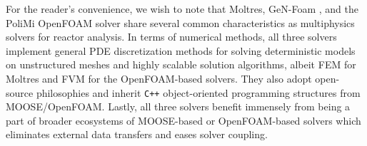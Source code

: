 For the reader's convenience, we wish to note that Moltres, GeN-Foam
\cite{fiorina_gen-foam_2015}, and the PoliMi OpenFOAM solver
\cite{aufiero_development_2014} share several common characteristics as
multiphysics solvers for reactor analysis. In terms of numerical methods, all
three solvers implement general \gls{PDE} discretization methods for solving
deterministic models on unstructured meshes and highly scalable solution
algorithms, albeit \gls{FEM} for Moltres and \gls{FVM} for the OpenFOAM-based
solvers. They also adopt open-source philosophies and inherit \texttt{C++}
object-oriented programming structures from \gls{MOOSE}/OpenFOAM. Lastly, all
three solvers benefit immensely from being a part of broader ecosystems of
\gls{MOOSE}-based or OpenFOAM-based solvers which eliminates external data
transfers and eases solver coupling.
